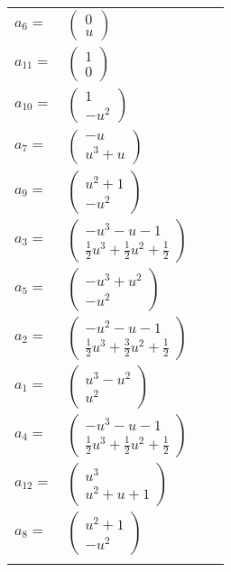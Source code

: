 \documentclass[1p]{elsarticle_modified}
\theoremstyle{definition}
\begin{document}
\begin{tabular}{m{7pt} m{180pt} m{7pt} m{180pt} }
\flushright $a_{6}=$&$\begin{pmatrix}0\\u\end{pmatrix}$ \\
\flushright $a_{11}=$&$\begin{pmatrix}1\\0\end{pmatrix}$ \\
\flushright $a_{10}=$&$\begin{pmatrix}1\\- u^2\end{pmatrix}$ \\
\flushright $a_{7}=$&$\begin{pmatrix}- u\\u^3+u\end{pmatrix}$ \\
\flushright $a_{9}=$&$\begin{pmatrix}u^2+1\\- u^2\end{pmatrix}$ \\
\flushright $a_{3}=$&$\begin{pmatrix}- u^3- u-1\\\frac{1}{2} u^3+\frac{1}{2} u^2+\frac{1}{2}\end{pmatrix}$ \\
\flushright $a_{5}=$&$\begin{pmatrix}- u^3+u^2\\- u^2\end{pmatrix}$ \\
\flushright $a_{2}=$&$\begin{pmatrix}- u^2- u-1\\\frac{1}{2} u^3+\frac{3}{2} u^2+\frac{1}{2}\end{pmatrix}$ \\
\flushright $a_{1}=$&$\begin{pmatrix}u^3- u^2\\u^2\end{pmatrix}$ \\
\flushright $a_{4}=$&$\begin{pmatrix}- u^3- u-1\\\frac{1}{2} u^3+\frac{1}{2} u^2+\frac{1}{2}\end{pmatrix}$ \\
\flushright $a_{12}=$&$\begin{pmatrix}u^3\\u^2+u+1\end{pmatrix}$ \\
\flushright $a_{8}=$&$\begin{pmatrix}u^2+1\\- u^2\end{pmatrix}$\\&\end{tabular}
\end{document}
